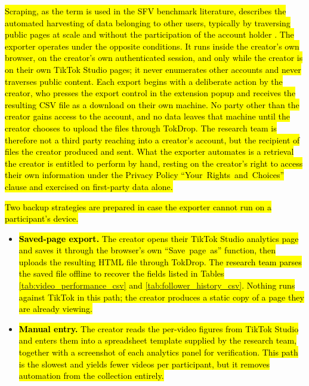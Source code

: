 \hl{Scraping, as the term is used in the SFV benchmark literature, describes the automated harvesting of data belonging to other users, typically by traversing public pages at scale and without the participation of the account holder \mbox{\cite{li2025vquala}}. The exporter operates under the opposite conditions. It runs inside the creator's own browser, on the creator's own authenticated session, and only while the creator is on their own TikTok Studio pages; it never enumerates other accounts and never traverses public content. Each export begins with a deliberate action by the creator, who presses the export control in the extension popup and receives the resulting CSV file as a download on their own machine. No party other than the creator gains access to the account, and no data leaves that machine until the creator chooses to upload the files through TokDrop. The research team is therefore not a third party reaching into a creator's account, but the recipient of files the creator produced and sent. What the exporter automates is a retrieval the creator is entitled to perform by hand, resting on the creator's right to access their own information under the Privacy Policy \mbox{``Your Rights and Choices''} clause \mbox{\cite{tiktok_privacy_2026}} and exercised on first-party data alone.}

\hl{Two backup strategies are prepared in case the exporter cannot run on a participant's device.}

\begin{itemize}
    \item \hl{\textbf{Saved-page export.} The creator opens their TikTok Studio analytics page and saves it through the browser's own \mbox{``Save page as''} function, then uploads the resulting HTML file through TokDrop. The research team parses the saved file offline to recover the fields listed in Tables \mbox{\ref{tab:video_performance_csv}} and \mbox{\ref{tab:follower_history_csv}}. Nothing runs against TikTok in this path; the creator produces a static copy of a page they are already viewing.}

    \item \hl{\textbf{Manual entry.} The creator reads the per-video figures from TikTok Studio and enters them into a spreadsheet template supplied by the research team, together with a screenshot of each analytics panel for verification. This path is the slowest and yields fewer videos per participant, but it removes automation from the collection entirely.}
\end{itemize}

